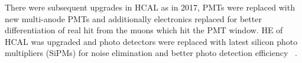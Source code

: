 There were subsequent upgrades in HCAL as in 2017, PMTs were replaced with new multi-anode PMTs and additionally electronics replaced for better differentiation of real hit from the muons which hit the PMT window. HE of HCAL was upgraded and photo detectors were replaced with latest silicon photo multipliers (SiPMs) for noise elimination and better photo detection efficiency ~\cite{pixel_hcal_upgrade}. %
